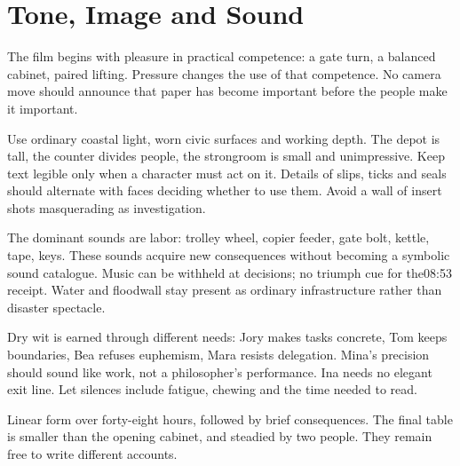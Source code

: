 \section{Tone, Image and Sound}
The film begins with pleasure in practical competence: a gate turn, a balanced cabinet, paired lifting. Pressure changes the use of that competence. No camera move should announce that paper has become important before the people make it important.

Use ordinary coastal light, worn civic surfaces and working depth. The depot is tall, the counter divides people, the strongroom is small and unimpressive. Keep text legible only when a character must act on it. Details of slips, ticks and seals should alternate with faces deciding whether to use them. Avoid a wall of insert shots masquerading as investigation.

The dominant sounds are labor: trolley wheel, copier feeder, gate bolt, kettle, tape, keys. These sounds acquire new consequences without becoming a symbolic sound catalogue. Music can be withheld at decisions; no triumph cue for the08:53 receipt. Water and floodwall stay present as ordinary infrastructure rather than disaster spectacle.

Dry wit is earned through different needs: Jory makes tasks concrete, Tom keeps boundaries, Bea refuses euphemism, Mara resists delegation. Mina's precision should sound like work, not a philosopher's performance. Ina needs no elegant exit line. Let silences include fatigue, chewing and the time needed to read.

Linear form over forty-eight hours, followed by brief consequences. The final table is smaller than the opening cabinet, and steadied by two people. They remain free to write different accounts.
